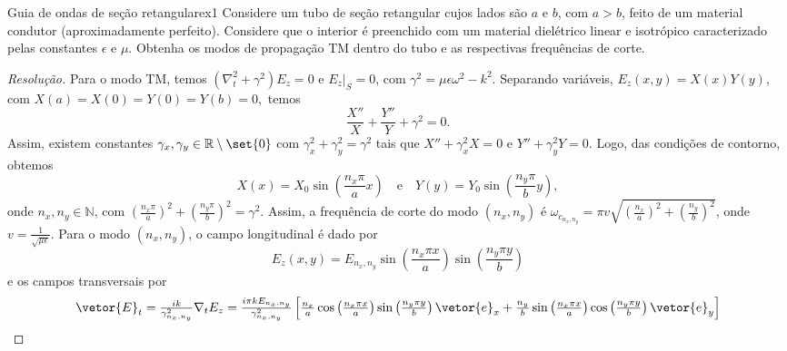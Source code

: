 \begin{exercício}{Guia de ondas de seção retangular}{ex1}
    Considere um tubo de seção retangular cujos lados são \(a\) e \(b\), com \(a > b\), feito de um material condutor (aproximadamente perfeito). Considere que o interior é preenchido com um material dielétrico linear e isotrópico caracterizado pelas constantes \(\epsilon\) e \(\mu\). Obtenha os modos de propagação TM dentro do tubo e as respectivas frequências de corte.
\end{exercício}
\begin{proof}[Resolução]
    Para o modo TM, temos \((\nabla_t^2 + \gamma^2)E_z = 0\) e \(\left.E_z\right|_S = 0\), com \(\gamma^2 = \mu \epsilon \omega^2 - k^2\). Separando variáveis, \(E_z(x,y) = X(x) Y(y),\) com \(X(a) = X(0) = Y(0) = Y(b) = 0,\) temos
    \begin{equation*}
        \frac{X''}{X} + \frac{Y''}{Y} + \gamma^2 = 0.
    \end{equation*}
    Assim, existem constantes \(\gamma_x, \gamma_y \in \mathbb{R} \setminus \set{0}\) com \(\gamma_x^2 + \gamma_y^2 = \gamma^2\) tais que \(X'' + \gamma_x^2 X = 0\) e \(Y'' + \gamma_y^2 Y = 0\). Logo, das condições de contorno, obtemos
    \begin{equation*}
        X(x) = X_0 \sin\left(\frac{n_x\pi}{a}x\right)
        \quad\text{e}\quad
        Y(y) = Y_0 \sin\left(\frac{n_y\pi}{b}y\right),
    \end{equation*}
    onde \(n_x, n_y \in \mathbb{N}\), com \(\left(\frac{n_x\pi}{a}\right)^2 + \left(\frac{n_y \pi}{b}\right)^2 = \gamma^2\). Assim, a frequência de corte do modo \((n_x, n_y)\) é \(\omega_{c_{n_x, n_y}} = \pi v \sqrt{\left(\frac{n_x}{a}\right)^2 + \left(\frac{n_y}{b}\right)^2}\), onde \(v = \frac{1}{\sqrt{\mu \epsilon}}.\) Para o modo \((n_x, n_y)\), o campo longitudinal é dado por
    \begin{equation*}
        E_z(x,y) = E_{n_x, n_y} \sin\left(\frac{n_x \pi x}{a}\right)\sin\left(\frac{n_y \pi y}{b}\right)
    \end{equation*}
    e os campos transversais por
    \begin{equation*}
        \textstyle
        \vetor{E}_t = \frac{ik}{\gamma_{n_x, n_y}^2} \nabla_t E_z = \frac{i \pi k E_{n_x, n_y}}{\gamma^2_{n_x, n_y}}\left[\frac{n_x}{a}\cos\left(\frac{n_x \pi x}{a}\right)\sin\left(\frac{n_y \pi y}{b}\right)\vetor{e}_x + \frac{n_y}{b}\sin\left(\frac{n_x \pi x}{a}\right)\cos\left(\frac{n_y \pi y}{b}\right)\vetor{e}_y\right]
    \end{equation*}

\end{proof}
